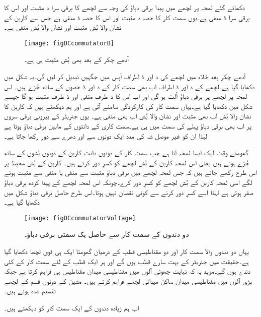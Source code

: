 دکھائے گئے لمحہ پر لچھے میں پیدا برقی دباؤ  کی وجہ سے لچھے کا برقی سرا د مثبت اور اس کا برقی سرا ڈ منفی ہے۔یوں سمت کار کا حصہ د مثبت اور اس کا حصہ ڈ منفی ہے جس سے کاربن کے  نشان والا بُش مثبت اور  نشان والا بُش منفی ہے۔
\begin{figure}
\centering
\texttt{[image: figDCcommutatorB]}
\caption{آدھے چکر کے بعد بھی  بُش مثبت ہی ہے۔}
\label{شکل_یکسمتی_میکانی_سمتکار_آدھے_چکر_بعد}
\end{figure}
آدھے چکر بعد خلاء میں لچھے کی د اور ڈ اطراف آپس میں جگہیں تبدیل کر لیں گی۔یہ شکل   میں دکھایا گیا ہے۔لچھے کے د اور ڈ اطراف اب بھی سمت کار کے د اور ڈ حصوں کے ساتھ جُڑے ہیں۔ اس لمحہ پر لچھے پر برقی دباؤ اُلٹ ہو گی اور اب اس کا د طرف منفی اور ڈ طرف مثبت ہو گا جیسے شکل میں دکھایا گیا ہے۔یہاں سمت کار کی کارکردگی سامنے آتی ہے اور ہم دیکھتے ہیں کہ کاربن کا   نشان والا بُش اب بھی مثبت اور  نشان والا بُش اب بھی منفی ہے۔ یوں جنریٹر کے بیرونی برقی سروں پر اب بھی برقی دباؤ پہلے کی سمت میں ہی ہے۔سمت کاری کے دانتوں کے مابین برقی دباؤ ہوتا ہے لہٰذا ان کو غیر موصل شہ کی مدد ایک دونوں سے اور دھرے سے دور رکھا جاتا ہے۔

گھومتے وقت ایک ایسا لمحہ آتا ہے جب سمت کار کے دونوں دانت کاربن کے دونوں بُشوں کے ساتھ جُڑے ہوتے ہیں یعنی اس لمحہ کاربن کے بُش لچھے کو کسرِ دور کرتے ہیں۔ کاربن کے بُش محیط پر اس طرح رکھے جاتے ہیں کہ جس لمحہ لچھے میں برقی دباؤ مثبت سے منفی یا منفی سے مثبت ہونے لگے اسی لمحہ کاربن کے بُش لچھے کو کسرِ دور کرے۔چونکہ اس لمحہ لچھے کے پیدا کردہ برقی دباؤ صفر ہوتی ہے لہٰذا اسے کسرِ دور کرنے سے کوئی نقصان نہیں ہوتا۔اس طرح حاصل برقی دباؤ شکل   میں دکھایا گیا ہے۔
\begin{figure}
\centering
\texttt{[image: figDCcommutatorVoltage]}
\caption{دو دندوں کے سمت کار سے حاصل یک سمتی برقی دباؤ۔}
\label{شکل_یکسمتی_دو_دندوں_کا_سمتکار}
\end{figure}


یہاں دو دندوں والا سمت کار اور دو مقناطیسی قطب کے درمیان گھومتا ایک ہی قوی لچھا دکھایا گیا ہے۔حقیقت میں جنریٹر کے بہت سارے قطب ہوں گے اور ہر ایک قطب کے لئے سمت کار کے کئی دندے ہوں گے۔مزید یہ کہ نہایت چھوٹی آلوں میں مقناطیسی میدان مقناطیس ہی فراہم کرتا ہے جبکہ بڑی آلوں میں مقناطیسی میدان ساکن میدانی لچھے فراہم کرتے ہیں۔ مشین کے دونوں قسم کے لچھے تقسیم شدہ ہوتے ہیں۔

اب ہم زیادہ دندوں کے ایک سمت کار کو دیکھتے ہیں۔

